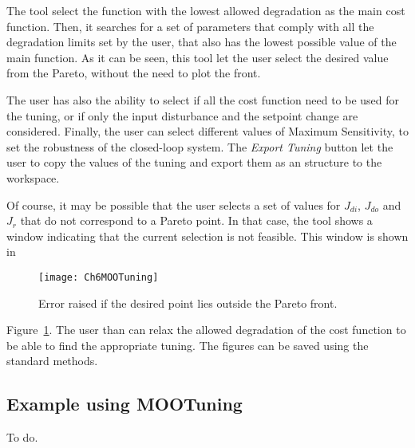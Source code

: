 The tool select the function with the lowest allowed degradation as the main cost function. Then, it searches for a set of parameters that comply with all the degradation limits set by the user, that also has the lowest possible value of the main function. As it can be seen, this tool let the user select the desired value from the Pareto, without the need to plot the front.

The user has also the ability to select if all the cost function need to be used for the tuning, or if only the input disturbance and the setpoint change are considered. Finally, the user can select different values of Maximum Sensitivity, to set the robustness of the closed-loop system. The \textit{Export Tuning} button let the user to copy the values of the tuning and export them as an structure to the \matlab{} workspace.

Of course, it may be possible that the user selects a set of values for $J_{di}$, $J_{do}$ and $J_r$ that do not correspond to a Pareto point. In that case, the tool shows a window indicating that the current selection is not feasible. This window is shown in %
%
\begin{figure}[tb]
	\centering
	\texttt{[image: Ch6MOOTuning]}
	\caption{Error raised if the desired point lies outside the Pareto front.}
	\label{fig:Ch6MOOTuning}
\end{figure}
%
Figure~\ref{fig:Ch6MOOTuning}. The user than can relax the allowed degradation of the cost function to be able to find the appropriate tuning. The figures can be saved using the standard \matlab{} methods.

\subsection{Example using MOOTuning}
\label{sec:MOOTuningExample}
To do.